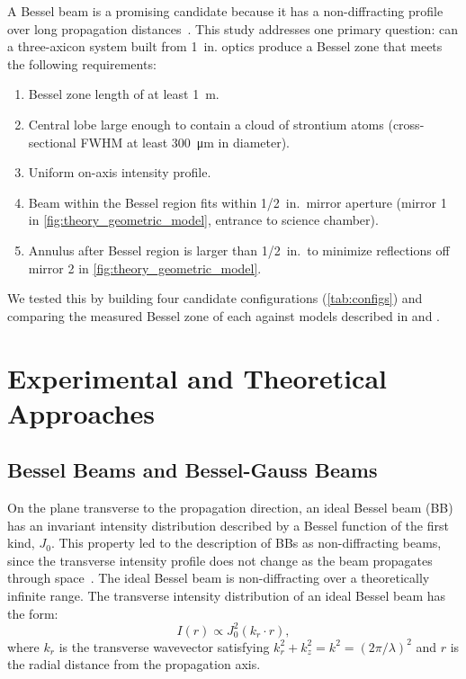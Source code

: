 \documentclass[
  aps,
  twocolumn,
  reprint,              %
  superscriptaddress,
  amsmath,
  amssymb,
  floatfix,
  longbibliography,      %
  nofootinbib %
]{revtex4-2}
\begin{document}
A Bessel beam is a promising candidate because it has a non-diffracting profile over long propagation distances~\cite{durninDiffractionfreeBeams1987,
  durninComparisonBesselGaussian1988, raoConceptualReviewBessel2024}.
This study addresses one primary question: can a three-axicon system built from 1~in. optics produce a Bessel zone that meets the following requirements:
\begin{enumerate}
  \item Bessel zone length of at least \SI{1}{\meter}.
  \item Central lobe large enough to contain a cloud of strontium atoms (cross-sectional FWHM at least \SI{300}{\micro\meter} in diameter).
  \item Uniform on-axis intensity profile.
  \item Beam within the Bessel region fits within 1/2~in.\ mirror aperture (mirror 1 in \autoref{fig:theory_geometric_model}, entrance to science chamber).
  \item Annulus after Bessel region is larger than 1/2~in.\, to minimize reflections off mirror 2 in \autoref{fig:theory_geometric_model}.
\end{enumerate}

We tested this by building four candidate configurations (\autoref{tab:configs}) and comparing the measured Bessel zone of each against models described in  and .

\section{Experimental and Theoretical Approaches}

\subsection{Bessel Beams and Bessel-Gauss Beams}

On the plane transverse to the propagation direction, an ideal Bessel beam (BB) has an invariant intensity distribution described by a Bessel function of the first kind, $J_0$. This property led to the description of BBs as non-diffracting beams, since the transverse intensity profile does not change as the beam propagates through space~\cite{durninDiffractionfreeBeams1987}. The ideal Bessel beam is non-diffracting over a theoretically infinite range. The transverse intensity distribution of an ideal Bessel beam has the form:
\begin{equation}
  I(r) \propto J_0^2(k_r \cdot r),
  \label{eq:ideal_bessel_beam}
\end{equation}
where $k_r$ is the transverse wavevector satisfying $k_r^2 + k_z^2 = k^2 = (2\pi/\lambda)^2$ and $r$ is the radial distance from the propagation axis.
\end{document}
